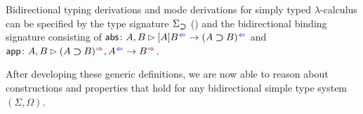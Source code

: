 \begin{example}
  Bidirectional typing derivations and mode derivations for simply typed $\lambda$-calculus can be specified by the type signature $\Sigma_{\mathbin{\bm{\supset}}}$ () and the bidirectional binding signature consisting of $\aritysymbol{\mathsf{abs}}{A , B}{[A]B^{\chk}}{(A \bto B)^{\chk}}$ and $\aritysymbol{\mathsf{app}}{A, B}{(A \bto B)^{\syn}, A^{\chk}}{B^{\syn}}$.
\end{example}

After developing these generic definitions, we are now able to reason about constructions and properties that hold for any bidirectional simple type system $(\Sigma, \Omega)$.
